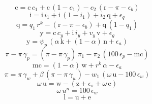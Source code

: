 \begin{dmath}
{{\mathrm{c}}}={{\mathrm{c}}}\, {{c_{1}}}+{{\mathrm{c}}}\, \left(1-{{c_{1}}}\right)-{{c_{2}}}\, \left({{\mathrm{r}}}-{{\pi}}-{{\epsilon_{b}}}\right)
\end{dmath}
\begin{dmath}
{{\mathrm{i}}}={{\mathrm{i}}}\, {{i_{1}}}+{{\mathrm{i}}}\, \left(1-{{i_{1}}}\right)+{{i_{2}}}\, {{\mathrm{q}}}+{{\epsilon_{q}}}
\end{dmath}
\begin{dmath}
{{\mathrm{q}}}={{q_{1}}}\, {{r^{k}}}-\left({{\mathrm{r}}}-{{\pi}}-{{\epsilon_{b}}}\right)+{{\mathrm{q}}}\, \left(1-{{q_{1}}}\right)
\end{dmath}
\begin{dmath}
{{\mathrm{y}}}={{\mathrm{c}}}\, {{c_{y}}}+{{\mathrm{i}}}\, {{i_{y}}}+{{v_{y}}}\, {{\mathrm{v}}}+{{\epsilon_{g}}}
\end{dmath}
\begin{dmath}
{{\mathrm{y}}}={{\psi_{p}}}\, \left({{\alpha}}\, {{\mathrm{k}}}+\left(1-{{\alpha}}\right)\, {{\mathrm{n}}}+{{\epsilon_{a}}}\right)
\end{dmath}
\begin{dmath}
{{\pi}}-{{\pi}}\, {{\gamma_{p}}}=\left({{\pi}}-{{\pi}}\, {{\gamma_{p}}}\right)\, {{\pi_{1}}}-{{\pi_{2}}}\, \left(100\, {{\epsilon_{p}}}-{{\mathrm{mc}}}\right)
\end{dmath}
\begin{dmath}
{{\mathrm{mc}}}=\left(1-{{\alpha}}\right)\, {{\mathrm{w}}}+{{r^{k}}}\, {{\alpha}}-{{\epsilon_{a}}}
\end{dmath}
\begin{dmath}
{{\pi}}={{\pi}}\, {{\gamma_{w}}}+{{\beta}}\, \left({{\pi}}-{{\pi}}\, {{\gamma_{w}}}\right)-{{w_{1}}}\, \left({{\omega}}\, {{\mathrm{u}}}-100\, {{\epsilon_{w}}}\right)
\end{dmath}
\begin{dmath}
{{\omega}}\, {{\mathrm{u}}}={{\mathrm{w}}}-\left({{\mathrm{z}}}+{{\epsilon_{s}}}+{{\omega}}\, {{\mathrm{e}}}\right)
\end{dmath}
\begin{dmath}
{{\omega}}\, {{u^{n}}}=100\, {{\epsilon_{w}}}
\end{dmath}
\begin{dmath}
{{\mathrm{l}}}={{\mathrm{u}}}+{{\mathrm{e}}}
\end{dmath}
